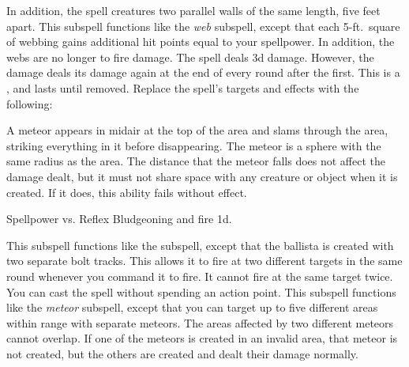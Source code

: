 In addition, the spell creatures two parallel walls of the same length, five feet apart.
This subspell functions like the \textit{web} subspell, except that each 5-ft.\ square of webbing gains additional hit points equal to your spellpower.
In addition, the webs are no longer  to fire damage.
The spell deals \minus3d damage.
However, the damage deals its damage again at the end of every round after the first.
This is a , and lasts until removed.
Replace the spell's targets and effects with the following:
\begin{spellcontent}
\begin{augmenttargetinginfo}
\end{augmenttargetinginfo}
\begin{augmenteffects}
\spelleffect
A meteor appears in midair at the top of the area and slams through the area, striking everything in it before disappearing.
The meteor is a sphere with the same radius as the area.
The distance that the meteor falls does not affect the damage dealt, but it must not share space with any creature or object when it is created.
If it does, this ability fails without effect.
\begin{spellattack}{Spellpower vs. Reflex}
\spellsuccess Bludgeoning and fire  \minus1d.
\end{spellattack}
\end{augmenteffects}
\end{spellcontent}
This subspell functions like the  subspell, except that the ballista is created with two separate bolt tracks.
This allows it to fire at two different targets in the same round whenever you command it to fire.
It cannot fire at the same target twice.
You can cast the spell without spending an action point.
This subspell functions like the \textit{meteor} subspell, except that you can target up to five different areas within range with separate meteors.
The areas affected by two different meteors cannot overlap.
If one of the meteors is created in an invalid area, that meteor is not created, but the others are created and dealt their damage normally.
